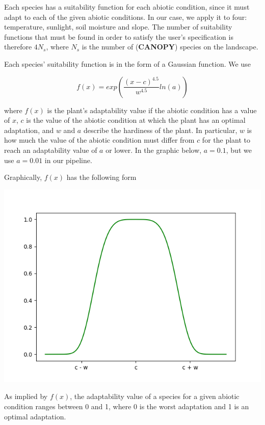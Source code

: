 \documentclass[12pt]{report}
\begin{document}
Each species has a suitability function for each abiotic condition, since it must adapt to each of the given abiotic conditions. In our case, we apply it to four: temperature, sunlight, soil moisture and slope. The number of suitability functions that must be found in order to satisfy the user's specification is therefore $4N_s$, where $N_s$ is the number of (\textbf{CANOPY}) species on the landscape.

Each species' suitability function is in the form of a Gaussian function. We use

\begin{equation}
f(x) = exp(\frac{(x - c)^{4.5}}{w^{4.5}} ln(a))
\label{equation:adaptFunction}
\end{equation}


where $f(x)$ is the plant's adaptability value if the abiotic condition has a value of $x$, $c$ is the value of the abiotic condition at which the plant has an optimal adaptation, and $w$ and $a$ describe the hardiness of the plant. In particular, $w$ is how much the value of the abiotic condition must differ from $c$ for the plant to reach an adaptability value of $a$ or lower. In the graphic below, $a = 0.1$, but we use $a = 0.01$ in our pipeline.

Graphically, $f(x)$ has the following form

\begin{center}
\includegraphics[scale=0.7]{singleGauss}
\end{center}

As implied by $f(x)$, the adaptability value of a species for a given abiotic condition ranges between 0 and 1, where 0 is the worst adaptation and 1 is an optimal adaptation.
\end{document}
